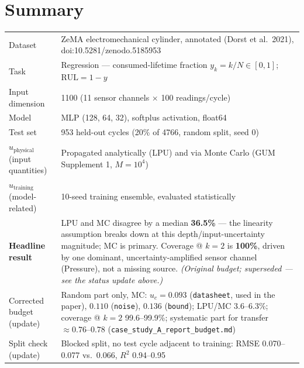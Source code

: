\documentclass[11pt]{article}
\newcommand{\Rul}{\text{RUL}}
\begin{document}
\tableofcontents

\section{Summary}
\label{sec:summary}

\begin{center}
\begin{tabular}{@{}p{3.4cm}p{10.6cm}@{}}
\toprule
Dataset & ZeMA electromechanical cylinder, annotated (Dorst et al.\ 2021), doi:10.5281/zenodo.5185953 \\
Task & Regression --- consumed-lifetime fraction $y_k = k/N \in [0,1]$; $\Rul = 1-y$ \\
Input dimension & 1100 (11 sensor channels $\times$ 100 readings/cycle) \\
Model & MLP (128, 64, 32), softplus activation, float64 \\
Test set & 953 held-out cycles (20\% of 4766, random split, seed 0) \\
$u_{\mathrm{physical}}$ (input quantities) & Propagated analytically (LPU) and via Monte Carlo (GUM Supplement 1, $M=10^4$) \\
$u_{\mathrm{training}}$ (model-related) & 10-seed training ensemble, evaluated statistically \\
\textbf{Headline result} & LPU and MC disagree by a median \textbf{36.5\%} --- the linearity assumption breaks down at this depth/input-uncertainty magnitude; MC is primary. Coverage @ $k=2$ is \textbf{100\%}, driven by one dominant, uncertainty-amplified sensor channel (Pressure), not a missing source. \emph{(Original budget; superseded --- see the status update above.)} \\
Corrected budget (update) & Random part only, MC: $u_c = 0.093$ (\texttt{datasheet}, used in the paper), $0.110$ (\texttt{noise}), $0.136$ (\texttt{bound}); LPU/MC 3.6--6.3\%; coverage @ $k=2$ 99.6--99.9\%; systematic part for transfer $\approx 0.76$--$0.78$ (\texttt{case\_\allowbreak study\_\allowbreak A\_\allowbreak report\_\allowbreak budget.md}) \\
Split check (update) & Blocked split, no test cycle adjacent to training: RMSE 0.070--0.077 vs.\ 0.066, $R^2$ 0.94--0.95 \\
\bottomrule
\end{tabular}
\end{center}
\end{document}
